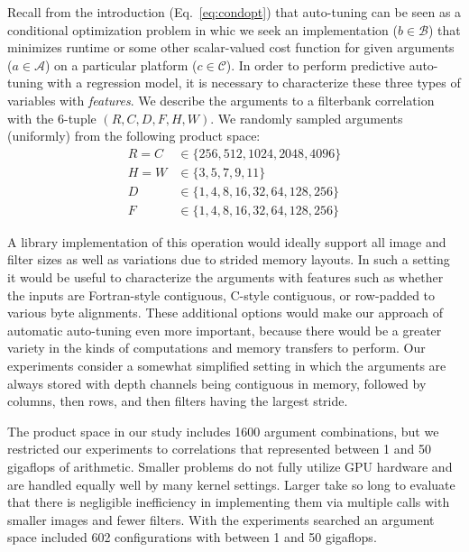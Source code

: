\documentclass{sig-alternate}
\begin{document}
Recall from the introduction (Eq.~\ref{eq:condopt}) that auto-tuning can be seen
as a conditional optimization problem in whic we seek an implementation ($b \in \mathcal{B}$) that minimizes runtime or some other scalar-valued cost function
for given arguments ($a \in \mathcal{A}$) on a particular platform ($c \in \mathcal{C}$).
In order to perform predictive auto-tuning with a regression model,
it is necessary to characterize these
three types of variables with {\em features}.
We describe the arguments to a filterbank correlation with the 6-tuple
$(R, C, D, F, H, W)$.
We randomly sampled arguments (uniformly) from the following product space:
\begin{align*}
R = C & \in \{ 256, 512, 1024, 2048, 4096 \} \\
H = W & \in \{ 3, 5, 7, 9, 11 \} \\
D &  \in \{1, 4, 8, 16, 32, 64, 128, 256 \} \\
F &  \in \{1, 4, 8, 16, 32, 64, 128, 256 \}
\end{align*}

A library implementation of this operation would ideally support all image and
filter sizes as well as variations due
to strided memory layouts. In such a setting it would be useful to characterize
the arguments with
features such as whether the inputs are Fortran-style contiguous, C-style contiguous, or row-padded to various byte alignments.
These additional options would make our
approach of automatic auto-tuning even more important, because there would be
a greater variety in the kinds of computations and memory transfers to
perform.
Our experiments consider a somewhat simplified setting in which the arguments are always stored
with depth channels being contiguous in memory, followed by columns, then rows, and then filters having the largest stride.

The product space in our study
includes 1600 argument combinations, but we restricted our experiments to correlations that
represented between 1 and 50 gigaflops of arithmetic.
Smaller problems do not fully utilize GPU hardware and are handled equally well by many kernel settings.
Larger take so long to evaluate that there is negligible
inefficiency in implementing them via multiple calls with smaller images and fewer filters.
With the experiments searched an argument space included 602 configurations with between 1 and 50 gigaflops.
\end{document}
